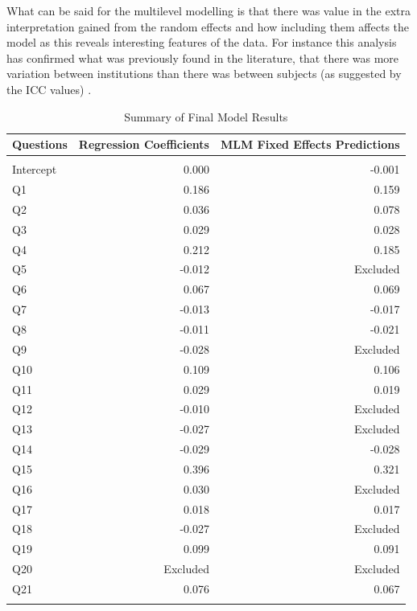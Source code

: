 \documentclass[11pt,a4paper]{report}
\begin{document}
What can be said for the multilevel modelling is that there was value in the extra interpretation gained from the random effects and how including them affects the model as this reveals interesting features of the data. For instance this analysis has confirmed what was previously found in the literature, that there was more variation between institutions than there was between subjects (as suggested by the ICC values) \cite{marshandcheng2008}. 

\vspace{4cm}

\begin{table}[h] \centering 
	\caption{Summary of Final Model Results} 
	\label{table:ModelResults} 
	\begin{tabular}{l !{\vrule width -1pt}r !{\vrule width -1pt}r} 
		\\[-1.8ex]\hline \hline
		Questions &  Regression Coefficients & MLM Fixed Effects Predictions \\
		\hline \\[-1.8ex] 
		Intercept & 0.000 & -0.001\\
		Q1 & 0.186 & 0.159   \\[0.1cm]
		Q2 & 0.036 & 0.078   \\[0.1cm]
		Q3 & 0.029 & 0.028  \\[0.1cm]
		Q4 & 0.212 & 0.185  \\[0.3cm] 
		Q5 & -0.012 & Excluded         \\[0.1cm]
		Q6 & 0.067 & 0.069   \\[0.1cm]
		Q7 & -0.013 & -0.017   \\[0.1cm]
		Q8 & -0.011 & -0.021   \\[0.1cm]
		Q9 & -0.028 & Excluded      \\[0.3cm]
		Q10 & 0.109 & 0.106  \\[0.1cm]
		Q11 & 0.029 & 0.019  \\[0.1cm]
		Q12 & -0.010 & Excluded \\[0.3cm] 
		Q13 & -0.027 & Excluded  \\[0.1cm]
		Q14 & -0.029 & -0.028  \\[0.1cm]
		Q15 & 0.396 & 0.321 \\[0.3cm]
		Q16 & 0.030 & Excluded   \\[0.1cm]
		Q17 & 0.018 & 0.017  \\[0.1cm]
		Q18 & -0.027 & Excluded \\[0.3cm]
		Q19 & 0.099 & 0.091  \\[0.1cm]
		Q20 & Excluded       & Excluded  \\[0.1cm]
		Q21 & 0.076 & 0.067  \\[0.1cm]
		\hline \hline \\[-1.8ex] 
	\end{tabular} 
\end{table}
\end{document}
